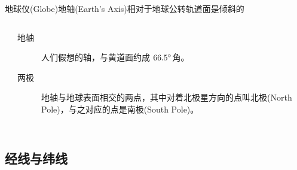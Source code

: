 \documentclass[10pt]{ctexbeamer}
\begin{document}
\begin{frame}{地球仪(Globe)}{地轴(Earth's Axis)相对于地球公转轨道面是倾斜的}
\begin{columns}
{            }
            \begin{description}
                \item[地轴] 人们假想的轴，与黄道面约成 $66.5\degree$角。\\
                \item[两极] 地轴与地球表面相交的两点，其中对着北极星方向的点叫\alert{北极(North Pole)}，与之对应的点是南极(South Pole)。
            \end{description}
        \end{columns}
    \end{frame}

    \subsection{经线与纬线}
\end{document}
